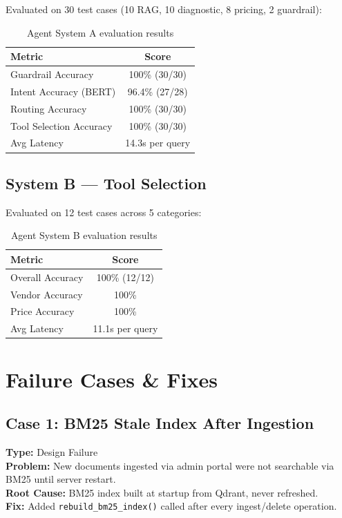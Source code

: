 \documentclass[12pt,a4paper]{article}
\begin{document}
Evaluated on 30 test cases (10 RAG, 10 diagnostic, 8 pricing, 2 guardrail):

\begin{table}[H]
\centering
\begin{tabular}{lc}
\toprule
\textbf{Metric} & \textbf{Score} \\
\midrule
Guardrail Accuracy & 100\% (30/30) \\
Intent Accuracy (BERT) & 96.4\% (27/28) \\
Routing Accuracy & 100\% (30/30) \\
Tool Selection Accuracy & 100\% (30/30) \\
Avg Latency & 14.3s per query \\
\bottomrule
\end{tabular}
\caption{Agent System A evaluation results}
\end{table}

\subsection{System B — Tool Selection}

Evaluated on 12 test cases across 5 categories:

\begin{table}[H]
\centering
\begin{tabular}{lc}
\toprule
\textbf{Metric} & \textbf{Score} \\
\midrule
Overall Accuracy & 100\% (12/12) \\
Vendor Accuracy & 100\% \\
Price Accuracy & 100\% \\
Avg Latency & 11.1s per query \\
\bottomrule
\end{tabular}
\caption{Agent System B evaluation results}
\end{table}

\section{Failure Cases \& Fixes}

\subsection{Case 1: BM25 Stale Index After Ingestion}
\textbf{Type:} Design Failure \\
\textbf{Problem:} New documents ingested via admin portal were not searchable via BM25 until server restart. \\
\textbf{Root Cause:} BM25 index built at startup from Qdrant, never refreshed. \\
\textbf{Fix:} Added \texttt{rebuild\_bm25\_index()} called after every ingest/delete operation.
\end{document}
